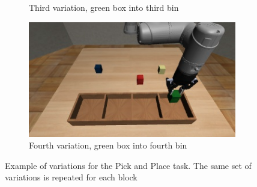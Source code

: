 \begin{figure}[hbt!]
\begin{subfigure}{0.2\textwidth}
        \caption{Third variation, green box into third bin}
        \label{fig:third_variation}
    \end{subfigure}
    \hfill
    \begin{subfigure}{0.2\textwidth}
        \centering
        \includegraphics[width=\textwidth]{Figures/images/pick_place/task_4.png}
        \caption{Fourth variation, green box into fourth bin}
        \label{fig:fourth_variation}
    \end{subfigure}
    \caption{Example of variations for the Pick and Place task. The same set of variations is repeated for each block}
    \label{fig:example_of_variations_for_pick_place}
\end{figure}

